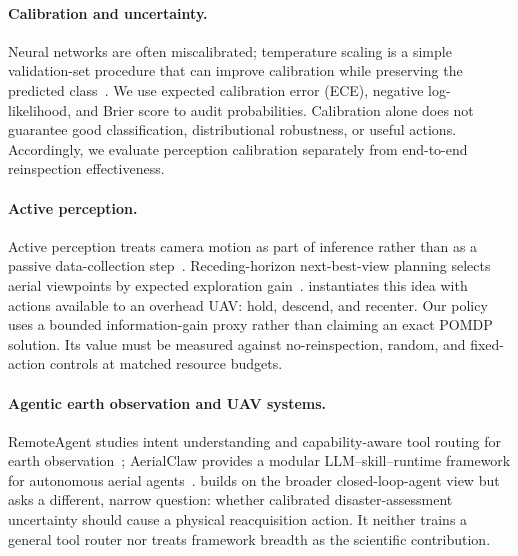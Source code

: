 \paragraph{Calibration and uncertainty.}
Neural networks are often miscalibrated; temperature scaling is a simple validation-set procedure that can improve calibration while preserving the predicted class~\cite{guo2017calibration}.
We use expected calibration error (ECE), negative log-likelihood, and Brier score to audit probabilities.
Calibration alone does not guarantee good classification, distributional robustness, or useful actions.
Accordingly, we evaluate perception calibration separately from end-to-end reinspection effectiveness.

\paragraph{Active perception.}
Active perception treats camera motion as part of inference rather than as a passive data-collection step~\cite{bajcsy1988active}.
Receding-horizon next-best-view planning selects aerial viewpoints by expected exploration gain~\cite{bircher2016nbv}.
\ProjectName instantiates this idea with actions available to an overhead UAV: hold, descend, and recenter.
Our policy uses a bounded information-gain proxy rather than claiming an exact POMDP solution.
Its value must be measured against no-reinspection, random, and fixed-action controls at matched resource budgets.

\paragraph{Agentic earth observation and UAV systems.}
RemoteAgent studies intent understanding and capability-aware tool routing for
earth observation~\cite{yao2026remoteagent}; AerialClaw provides a modular
LLM--skill--runtime framework for autonomous aerial agents~\cite{li2026aerialclaw}.
\ProjectName builds on the broader closed-loop-agent view but asks a different,
narrow question: whether calibrated disaster-assessment uncertainty should
cause a physical reacquisition action.
It neither trains a general tool router nor treats framework breadth as the
scientific contribution.
